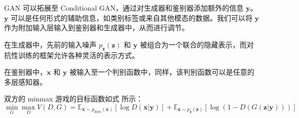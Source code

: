 \documentclass{myarticle}
\begin{document}
    GAN 可以拓展至 Conditional GAN，通过对生成器和鉴别器添加额外的信息 $\boldsymbol{y}$。$\boldsymbol{y}$ 可以是任何形式的辅助信息，如类别标签或来自其他模态的数据。我们可以将 $\boldsymbol{y}$ 作为附加输入层输入到鉴别器和生成器中，从而进行调节。

    在生成器中，先前的输入噪声 $p_{\boldsymbol{z}}(\boldsymbol{z})$ 和 $\boldsymbol{y}$ 被组合为一个联合的隐藏表示，而对抗性训练的框架允许各种灵活的表示方式。

    在鉴别器中，$\boldsymbol{x}$ 和 $\boldsymbol{y}$ 被输入至一个判别函数中，同样，该判别函数可以是任意的多层感知器。

    双方的 minmax 游戏的目标函数如式 所示：
    \begin{equation}
        \min_{G}\max_{D}V(D,G)=\mathbb{E}_{\boldsymbol{x}\sim p_{data}(\boldsymbol{x})}[\log D(\boldsymbol{x}|\boldsymbol{y})]+\mathbb{E}_{\boldsymbol{z}\sim p_{\boldsymbol{z}}(\boldsymbol{z})}[\log(1-D(G(\boldsymbol{z}|\boldsymbol{y})))]
        \label{cGAN objective function}
    \end{equation}

    \clearpage
    
    
\end{document}
